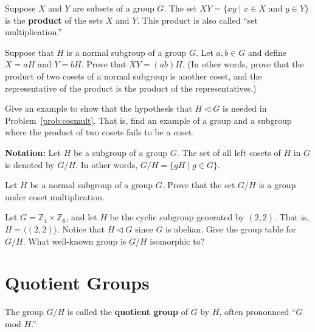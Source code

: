 \begin{definition}
Suppose \(X\) and \(Y\) are subsets of a group \(G\). The set \(XY = \{xy \mid x\in X \mbox{ and } y\in Y\}\) is the \textbf{product} of the sets \(X\) and \(Y\). This product is also called ``set multiplication.''
\end{definition}

\begin{problem}\label{prob:cosmult}
Suppose that \(H\) is a normal subgroup of a group \(G\). Let \(a,b\in G\) and define \(X = aH\) and \(Y = bH\). Prove that \(XY = (ab)H\). (In other words, prove that the product of two cosets of a normal subgroup is another coset, and the representative of the product is the product of the representatives.)
\end{problem}

\begin{problem}
Give an example to show that the hypothesis that \(H\lhd G\)  is needed in Problem~\ref{prob:cosmult}. That is, find an example of a group and a subgroup where the product of two cosets fails to be a coset.
\end{problem}

\textbf{Notation:} Let \(H\) be a subgroup of a group \(G\). The set of all left cosets of \(H\) in \(G\) is denoted by \(G/H\). In other words, \(G/H = \{gH \mid g\in G\}\).

\begin{problem}
Let \(H\) be a normal subgroup of a group \(G\). Prove that the set \(G/H\)  is a group under coset multiplication.
\end{problem}

\begin{problem}
Let \(G = \mathbb{Z}_4\times \mathbb{Z}_6\), and let \(H\) be the cyclic subgroup generated by \((2,2)\). That is, \(H = \langle (2,2) \rangle \). Notice that \(H \lhd G\)  since \(G\) is abelian. Give the group table for \(G/H\). What well-known group is \(G/H\) isomorphic to?
\end{problem}

\section{Quotient Groups}

\begin{definition}
The group \(G/H\) is called the \textbf{quotient group} of \(G\) by \(H\), often pronounced ``\(G\) mod \(H\).''
\end{definition}

